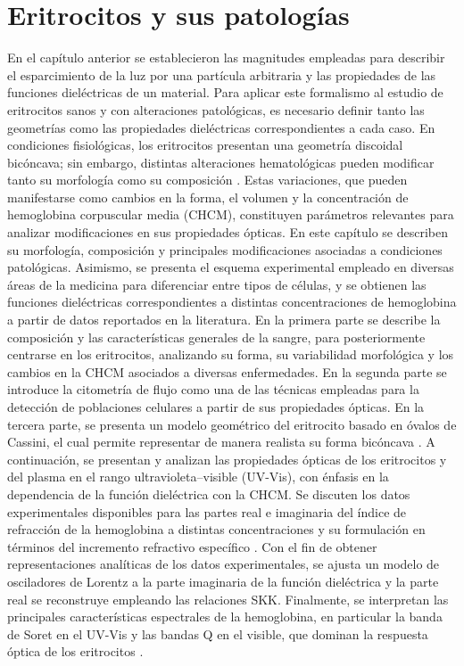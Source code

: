 
\chapter{Eritrocitos y sus patologías}
\label{chapter:eritrocitos}


En el capítulo anterior se establecieron las magnitudes empleadas para describir el esparcimiento de la luz por una partícula arbitraria y las propiedades de las funciones dieléctricas de un material. Para aplicar este formalismo al estudio de eritrocitos sanos y con alteraciones patológicas, es necesario definir tanto las geometrías como las propiedades dieléctricas correspondientes a cada caso. En condiciones fisiológicas, los eritrocitos presentan una geometría discoidal bicóncava; sin embargo, distintas alteraciones hematológicas pueden modificar tanto su morfología como su composición \cite{palTextbookMedicalPhysiology2021}. Estas variaciones, que pueden manifestarse como cambios en la forma, el volumen y la concentración de hemoglobina corpuscular media (CHCM), constituyen parámetros relevantes para analizar modificaciones en sus propiedades ópticas. En este capítulo se describen su morfología, composición y principales modificaciones asociadas a condiciones patológicas. Asimismo, se presenta el esquema experimental empleado en diversas áreas de la medicina para diferenciar entre tipos de células, y se obtienen las funciones dieléctricas correspondientes a distintas concentraciones de hemoglobina a partir de datos reportados en la literatura. En la primera parte se describe la composición y las características generales de la sangre, para posteriormente centrarse en los eritrocitos, analizando su forma, su variabilidad morfológica y los cambios en la CHCM asociados a diversas enfermedades. En la segunda parte se introduce la citometría de flujo como una de las técnicas empleadas para la detección de poblaciones celulares a partir de sus propiedades ópticas. En la tercera parte, se presenta un modelo geométrico del eritrocito basado en óvalos de Cassini, el cual permite representar de manera realista su forma bicóncava \cite{ereminaDifferentShapeModels2006}. A continuación, se presentan y analizan las propiedades ópticas de los eritrocitos y del plasma en el rango ultravioleta–visible (UV-Vis), con énfasis en la dependencia de la función dieléctrica con la CHCM. Se discuten los datos experimentales disponibles para las partes real e imaginaria del índice de refracción de la hemoglobina a distintas concentraciones y su formulación en términos del incremento refractivo específico \cite{friebelModelFunctionCalculate2006}. Con el fin de obtener representaciones analíticas de los datos experimentales, se ajusta un modelo de osciladores de Lorentz a la parte imaginaria de la función dieléctrica  y la parte real se reconstruye empleando las relaciones SKK. Finalmente, se interpretan las principales características espectrales de la hemoglobina, en particular la banda de Soret en el UV-Vis y las bandas Q en el visible, que dominan la respuesta óptica de los eritrocitos \cite{dayerBandAssignmentHemoglobin2010}.

